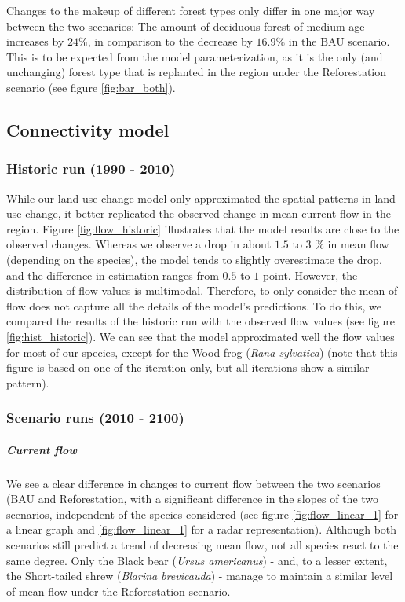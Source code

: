 Changes to the makeup of different forest types only differ in one major way between the two scenarios: The amount of deciduous forest of medium age increases by $24\%$, in comparison to the decrease by $16.9\%$ in the BAU scenario. This is to be expected from the model parameterization, as it is the only (and unchanging) forest type that is replanted in the region under the Reforestation scenario (see figure \ref{fig:bar_both}). \\

\subsection{Connectivity model}

\subsubsection*{Historic run (1990 - 2010)}

While our land use change model only approximated the spatial patterns in land use change, it better replicated the observed change in mean current flow in the region. Figure \ref{fig:flow_historic} illustrates that the model results are close to the observed changes. Whereas we observe a drop in about $1.5$ to $3$ \% in mean flow (depending on the species), the model tends to slightly overestimate the drop, and the difference in estimation ranges from $0.5$ to $1$ point. However, the distribution of flow values is multimodal. Therefore, to only consider the mean of flow does not capture all the details of the model’s predictions. To do this, we compared the results of the historic run with the observed flow values (see figure \ref{fig:hist_historic}).  We can see that the model approximated well the flow values for most of our species, except for the Wood frog (\textit{Rana sylvatica}) (note that this figure is based on one of the iteration only, but all iterations show a similar pattern). \\

\subsubsection*{Scenario runs (2010 - 2100)}

\vspace{1em}

\subparagraph*{\textit{Current flow}} We see a clear difference in changes to current flow between the two scenarios (BAU and Reforestation, with a significant difference in the slopes of the two scenarios, independent of the species considered (see figure \ref{fig:flow_linear_1} for a linear graph and \ref{fig:flow_linear_1} for a radar representation). Although both scenarios still predict a trend of decreasing mean flow, not all species react to the same degree. Only the Black bear (\textit{Ursus americanus}) - and, to a lesser extent, the Short-tailed shrew (\textit{Blarina brevicauda}) - manage to maintain a similar level of mean flow under the Reforestation scenario.

